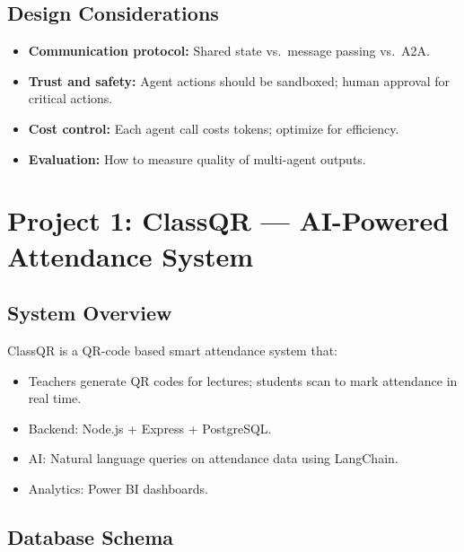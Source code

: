 \documentclass[11pt,a4paper]{article}
\begin{document}
\subsection{Design Considerations}
\begin{itemize}[nosep]
  \item \textbf{Communication protocol:} Shared state vs.\ message passing vs.\ A2A.
  \item \textbf{Trust and safety:} Agent actions should be sandboxed; human approval for critical actions.
  \item \textbf{Cost control:} Each agent call costs tokens; optimize for efficiency.
  \item \textbf{Evaluation:} How to measure quality of multi-agent outputs.
\end{itemize}

\newpage
\section{Project 1: ClassQR --- AI-Powered Attendance System}

\subsection{System Overview}
ClassQR is a QR-code based smart attendance system that:
\begin{itemize}[nosep]
  \item Teachers generate QR codes for lectures; students scan to mark attendance in real time.
  \item Backend: Node.js + Express + PostgreSQL.
  \item AI: Natural language queries on attendance data using LangChain.
  \item Analytics: Power BI dashboards.
\end{itemize}

\subsection{Database Schema}
\end{document}
